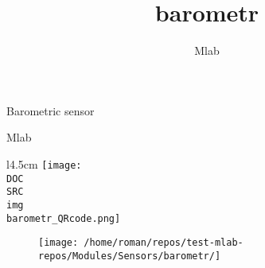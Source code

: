 \documentclass[12pt,a4paper]{article}
\author{ Mlab }
\title{ barometr }
\begin{document}
\fontsize{14.4}{20}\selectfont

\vspace*{\fill}

\begin{center}
{\Huge 
Barometric sensor
}

{\Large Mlab}

\vspace*{\fill}
\vspace*{1cm}

\end{center}

\begin{wrapfigure}{l}{4.5cm}
    \texttt{[image: \\DOC\\SRC\\img\\barometr\_QRcode.png]}
\end{wrapfigure}




\vspace*{\fill}
\vfill
\vspace*{1cm}

\begin{figure}[ht!]
\centering
\texttt{[image: /home/roman/repos/test-mlab-repos/Modules/Sensors/barometr/]} 
\end{figure}





\newpage



\end{document}
